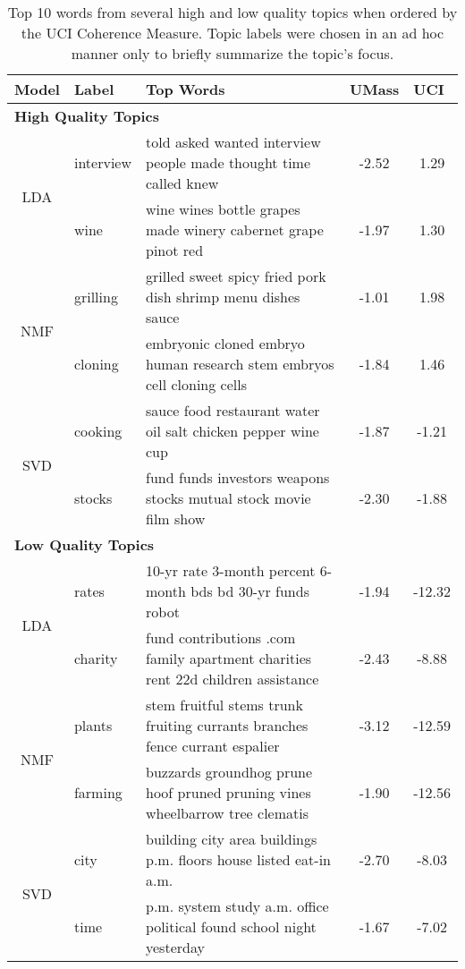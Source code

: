 \begin{table*}[h!t!b!]
\footnotesize
\center
\begin{tabular}{|cllcc|}
\multicolumn{1}{c}{Model} & Label & Top Words & UMass & \multicolumn{1}{l}{UCI} \\
\hline
\multicolumn{3}{l}{\textbf{High Quality Topics}} \\
\hline
\multirow{2}{*}{LDA} 
& interview & told asked wanted interview people made thought time called knew 
& -2.52 & 1.29 \\
& wine & wine wines bottle grapes made winery cabernet grape pinot red 
& -1.97 & 1.30 \\
\hline
\multirow{2}{*}{NMF} 
& grilling & grilled sweet spicy fried pork dish shrimp menu dishes sauce 
& -1.01 & 1.98 \\
& cloning & embryonic cloned embryo human research stem embryos cell cloning cells
& -1.84 & 1.46 \\
\hline
\multirow{2}{*}{SVD} 
& cooking & sauce food restaurant water oil salt chicken pepper wine cup 
& -1.87 & -1.21 \\
& stocks & fund funds investors weapons stocks mutual stock movie film show 
& -2.30 & -1.88 \\
\hline

\multicolumn{3}{l}{\textbf{Low Quality Topics}} \\
\hline
\multirow{2}{*}{LDA} 
& rates & 10-yr rate 3-month percent 6-month bds bd 30-yr funds robot 
& -1.94 & -12.32 \\
& charity & fund contributions .com family apartment charities rent 22d children assistance
& -2.43 & -8.88 \\
\hline
\multirow{2}{*}{NMF} 
& plants & stem fruitful stems trunk fruiting currants branches fence currant espalier 
& -3.12 & -12.59 \\
& farming & buzzards groundhog prune hoof pruned pruning vines wheelbarrow tree clematis
& -1.90 & -12.56 \\
\hline
\multirow{2}{*}{SVD} 
& city & building city area buildings p.m. floors house listed eat-in a.m.
& -2.70 & -8.03 \\
& time & p.m. system study a.m. office political found school night yesterday 
& -1.67 & -7.02 \\
\hline
\end{tabular}
\caption{Top 10 words from several high and low quality topics when ordered by
the UCI Coherence Measure.  Topic labels were chosen in an ad hoc manner only to
briefly summarize the topic's focus.}
\label{tab:best}
\end{table*}


